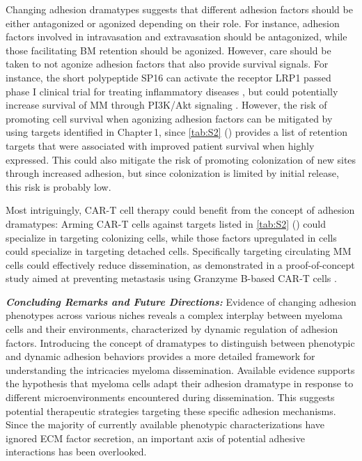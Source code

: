 Changing adhesion dramatypes suggests that different adhesion factors should be
either antagonized or agonized depending on their role. For instance, adhesion
factors involved in intravasation and extravasation should be antagonized, while
those facilitating BM retention%
\footterm{\footretentiveadhesionfactors}{\label{foot:retentiveadhesionfactors}}%
should be agonized. However, care should be taken to not agonize adhesion
factors that also provide survival signals. For instance, the short polypeptide
SP16 can activate the receptor LRP1  passed phase I clinical
trial for treating inflammatory diseases \cite{wohlfordPhaseClinicalTrial2021},
but could potentially increase survival of MM through PI3K/Akt signaling
\cite{potereDevelopingLRP1Agonists2019, heinemannInhibitingPI3KAKT2022}.
However, the risk of promoting cell survival when agonizing adhesion factors can
be mitigated by using targets identified in Chapter\,1, since \autoref{tab:S2}
() provides a list of retention
targets that were associated with
improved patient survival when highly expressed. This could also mitigate the
risk of promoting colonization of new sites through increased adhesion, but since
colonization is limited by initial release, this risk is probably low. 

Most intriguingly, CAR-T cell therapy could benefit from the concept of adhesion
dramatypes: Arming CAR-T cells against targets listed in \autoref{tab:S2}
() could specialize in targeting colonizing cells, while those
factors upregulated in \nMAina cells could specialize in targeting detached
cells. Specifically targeting circulating MM cells could effectively reduce
dissemination, as demonstrated in a proof-of-concept study aimed at preventing
metastasis using Granzyme B-based CAR-T cells \cite{sunGranzymeBbasedCAR2024}.


\textbf{\textit{Concluding Remarks and Future Directions:}} Evidence of changing
adhesion phenotypes across various niches reveals a complex interplay between
myeloma cells and their environments, characterized by dynamic regulation of
adhesion factors. Introducing the concept of dramatypes to distinguish between
phenotypic and dynamic adhesion behaviors provides a more detailed framework for
understanding the intricacies myeloma dissemination. Available evidence supports
the hypothesis that myeloma cells adapt their adhesion dramatype in response to
different microenvironments encountered during dissemination. This suggests
potential therapeutic strategies targeting these specific adhesion mechanisms.
Since the majority of currently available phenotypic characterizations have
ignored \ac{ECM} factor secretion, an important axis of potential adhesive
interactions has been overlooked.

